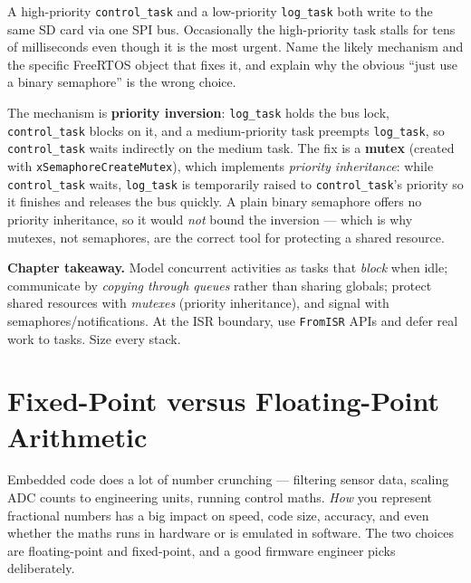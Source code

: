 \documentclass[11pt,a4paper,oneside]{book}
\newcommand{\code}[1]{\texttt{#1}}
\begin{document}
\begin{exercise}
A high-priority \code{control\_task} and a low-priority \code{log\_task} both
write to the same SD card via one SPI bus. Occasionally the high-priority task
stalls for tens of milliseconds even though it is the most urgent. Name the
likely mechanism and the specific FreeRTOS object that fixes it, and explain
why the obvious ``just use a binary semaphore'' is the wrong choice.
\end{exercise}
\begin{solution}
The mechanism is \textbf{priority inversion}: \code{log\_task} holds the bus lock,
\code{control\_task} blocks on it, and a medium-priority task preempts
\code{log\_task}, so \code{control\_task} waits indirectly on the medium task.
The fix is a \textbf{mutex} (created with \code{xSemaphoreCreateMutex}), which
implements \emph{priority inheritance}: while \code{control\_task} waits,
\code{log\_task} is temporarily raised to \code{control\_task}'s priority so it
finishes and releases the bus quickly. A plain binary semaphore offers no
priority inheritance, so it would \emph{not} bound the inversion --- which is why
mutexes, not semaphores, are the correct tool for protecting a shared resource.
\end{solution}

\begin{keyidea}
\textbf{Chapter takeaway.} Model concurrent activities as tasks that \emph{block}
when idle; communicate by \emph{copying through queues} rather than sharing
globals; protect shared resources with \emph{mutexes} (priority inheritance), and
signal with semaphores/notifications. At the ISR boundary, use \code{FromISR}
APIs and defer real work to tasks. Size every stack.
\end{keyidea}

\chapter{Fixed-Point versus Floating-Point Arithmetic}
\label{ch:fixedfloat}

Embedded code does a lot of number crunching --- filtering sensor data, scaling
ADC counts to engineering units, running control maths. \emph{How} you represent
fractional numbers has a big impact on speed, code size, accuracy, and even
whether the maths runs in hardware or is emulated in software. The two choices
are floating-point and fixed-point, and a good firmware engineer picks
deliberately.
\end{document}
